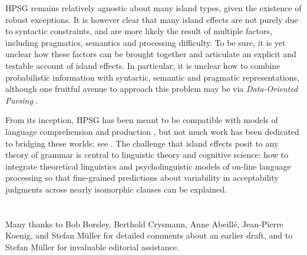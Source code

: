 \documentclass[output=paper
 	        ,biblatex
                ,babelshorthands
                ,newtxmath
                ,draftmode
                ,colorlinks, citecolor=brown
]{langscibook}
\begin{document}
HPSG remains relatively agnostic about many island types, given the existence of robust exceptions.
It is however clear that many island effects are not purely due to syntactic constraints, and are
more likely the result of multiple factors, including pragmatics, semantics and processing
difficulty.  To be sure, it is yet unclear how these factors can be brought together and articulate
an explicit and testable account of island effects. In particular, it is unclear how to combine
probabilistic information with syntactic, semantic and pragmatic representations, although one
fruitful avenue to approach this problem may be via \emph{Data-Oriented Parsing}
\citep{NF2002a-u,NF99a,Arnold:Linardaki:07,BSS2003a-ed,Bod2009a}.


From its inception, HPSG has been meant to be compatible with models of language comprehension and
production \citep{sagser,Sag:Wasow:ta,Sag:Wasow:ta2}, but not much work has been dedicated to
bridging these worlds; see . The challenge that island effects posit to
any theory of grammar is central to linguistic theory and cognitive science: how to integrate
theoretical linguistics and psycholinguistic models of on-line language processing so that
fine-grained predictions about variability in acceptability judgments across nearly isomorphic
clauses can be explained.


 
\section*{\acknowledgmentsUS}

Many thanks to Bob Borsley, Berthold Crysmann, Anne Abeillé, Jean-Pierre Koenig, and Stefan Müller
for detailed comments about an earlier draft, and to Stefan Müller for invaluable editorial
assistance.

{\sloppy
\printbibliography[heading=subbibliography,notkeyword=this] 
}
\end{document}
